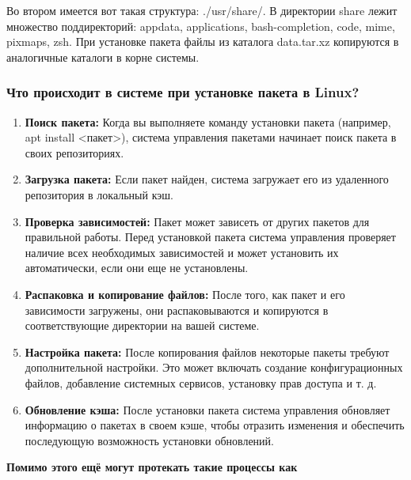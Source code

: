 \documentclass[oneside, final, 14pt]{extreport} %
\begin{document}
Во втором имеется вот такая структура: ./usr/share/. В директории share лежит
множество поддиректорий: appdata, applications, bash-completion, code, mime, pixmaps,
zsh.  При установке пакета файлы из каталога data.tar.xz копируются в аналогичные каталоги в корне системы.

\subsubsection{Что происходит в системе при установке пакета в Linux?}

\begin{enumerate}
    \item \textbf{Поиск пакета:} Когда вы выполняете команду установки пакета (например, apt install <пакет>), система управления пакетами начинает поиск пакета в своих репозиториях.
    \item \textbf{Загрузка пакета:} Если пакет найден, система загружает его из удаленного репозитория в локальный кэш.
    \item \textbf{Проверка зависимостей:} Пакет может зависеть от других пакетов для правильной работы. Перед установкой пакета система управления проверяет наличие всех необходимых зависимостей и может установить их автоматически, если они еще не установлены.
    \item \textbf{Распаковка и копирование файлов:} После того, как пакет и его зависимости загружены, они распаковываются и копируются в соответствующие директории на вашей системе.
    \item \textbf{Настройка пакета:} После копирования файлов некоторые пакеты требуют дополнительной настройки. Это может включать создание конфигурационных файлов, добавление системных сервисов, установку прав доступа и т. д.
    \item \textbf{Обновление кэша:} После установки пакета система управления обновляет информацию о пакетах в своем кэше, чтобы отразить изменения и обеспечить последующую возможность установки обновлений.
\end{enumerate}

\textbf{Помимо этого ещё могут протекать такие процессы как}
\end{document}
